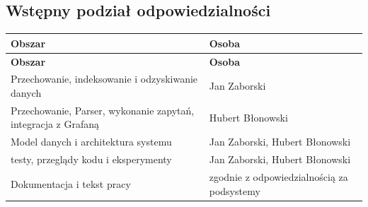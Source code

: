 \documentclass[12pt,a4paper]{article}
\begin{document}
\subsection{Wstępny podział odpowiedzialności}

\begingroup
\small
\begin{longtable}{>{\raggedright\arraybackslash}p{}>{\raggedright\arraybackslash}p{}}
    \hline
    \textbf{Obszar}                                               & \textbf{Osoba}                             \\
    \hline
    \endfirsthead
    \textbf{Obszar}                                               & \textbf{Osoba}                             \\
    \hline
    \endhead
    Przechowanie, indeksowanie i odzyskiwanie danych              & Jan Zaborski                               \\
    \hline
    Przechowanie, Parser, wykonanie zapytań, integracja z Grafaną & Hubert Błonowski                           \\
    \hline
    Model danych i architektura systemu                           & Jan Zaborski, Hubert Błonowski             \\
    \hline
    testy, przeglądy kodu i eksperymenty                          & Jan Zaborski, Hubert Błonowski             \\
    \hline
    Dokumentacja i tekst pracy                                    & zgodnie z odpowiedzialnością za podsystemy \\
    \hline
\end{longtable}
\endgroup
\end{document}
